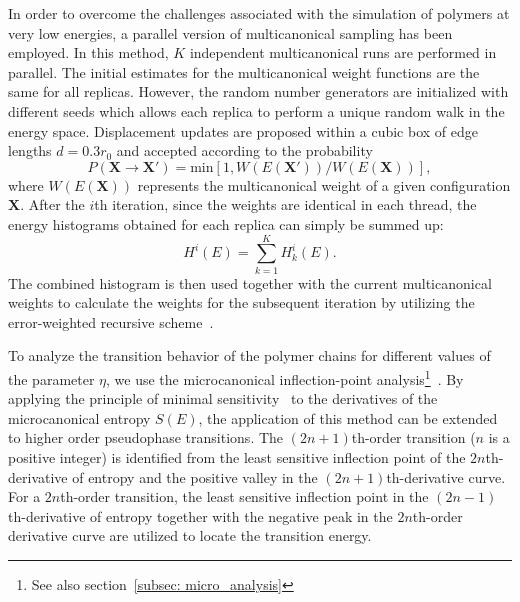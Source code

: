 \documentclass[12pt]{report}
\begin{document}
\newpage
In order to overcome the challenges associated with the simulation of polymers at very low energies, a parallel version of multicanonical sampling \cite{muca1a,muca2,Zierenberg2013} has been employed. In this method, $K$ independent multicanonical runs are performed in parallel. The initial estimates for the multicanonical weight functions are the same for all replicas. However, the random number generators are initialized with different seeds which allows each replica to perform a unique random walk in the energy space. Displacement updates are proposed within a cubic box of edge lengths $d=0.3r_0$ and accepted according to the probability
%
\begin{equation}
P(\mathbf{{X}} \rightarrow \mathbf{X}')= \mathrm{min}[1,W(E( \mathbf{X}'))/W(E( \mathbf{X}))],
\end{equation}
%
where $W(E( \mathbf{X}))$ represents the multicanonical weight of a given configuration $ \mathbf{X}$. After the $i$th iteration, since the weights are identical in each thread, the energy histograms obtained for each replica can simply be summed up:
%
\begin{equation}
    H^i(E)=\sum^K_{k=1}H^i_k(E). 
\end{equation}
%
The combined histogram is then used together with the current multicanonical weights to calculate the weights for the subsequent iteration by utilizing the error-weighted recursive
scheme~\cite{Bachmann2014,muca1a,muca2}. 

To analyze the transition behavior of the polymer chains for different values of the parameter $\eta$, we use the microcanonical inflection-point analysis\footnote{See also section~\ref{subsec: micro_analysis}}~\cite{Bachmann2014,Schnabel2011}. By applying the principle of minimal sensitivity~\cite{Stevenson} to the derivatives of the microcanonical entropy $S(E)$, the application of this method can be extended to higher order pseudophase transitions. The $(2n+1)$th-order transition ($n$ is a positive integer) is identified from the least sensitive inflection point of the $2n$th-derivative of entropy and the positive valley in the $(2n+1)$th-derivative curve. For a $2n$th-order transition, the least sensitive inflection point in the $(2n-1)$th-derivative of entropy together with the negative peak in the $2n$th-order derivative curve are utilized to locate the transition energy. 
%

\end{document}
